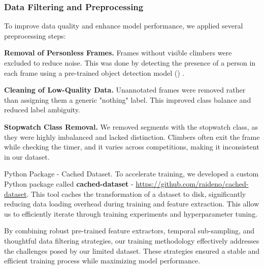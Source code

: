 \subsubsection*{Data Filtering and Preprocessing}
To improve data quality and enhance model performance, we applied several preprocessing steps:

\noindent\textbf{Removal of Personless Frames.} Frames without visible climbers were excluded to reduce noise. This was done by detecting the presence of a person in each frame using a pre-trained object detection model () \cite{yolo}.

\noindent\textbf{Cleaning of Low-Quality Data.} Unannotated frames were removed rather than assigning them a generic "nothing" label. This improved class balance and reduced label ambiguity.

\noindent\textbf{Stopwatch Class Removal.} We removed segments with the stopwatch class, as they were highly imbalanced and lacked distinction. Climbers often exit the frame while checking the timer, and it varies across competitions, making it inconsistent in our dataset.

\begin{AIbox}{Python Package - Cached Dataset.}
    To accelerate training, we developed a custom Python package called \textbf{cached-dataset} - \href{https://github.com/raideno/cached-dataset}{https://github.com/raideno/cached-dataset}. This tool caches the transformation of a dataset to disk, significantly reducing data loading overhead during training and feature extraction. This allow us to efficiently iterate through training experiments and hyperparameter tuning.
\end{AIbox}

By combining robust pre-trained feature extractors, temporal sub-sampling, and thoughtful data filtering strategies, our training methodology effectively addresses the challenges posed by our limited dataset. These strategies ensured a stable and efficient training process while maximizing model performance.